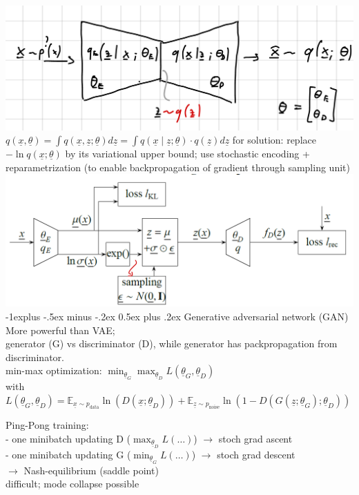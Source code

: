 \documentclass[a4paper,10pt,landscape]{article}
\makeatletter
\renewcommand{\subsection}{\@startsection{subsection}{2}{0mm}%
                                {-1explus -.5ex minus -.2ex}%
                                {0.5ex plus .2ex}%
                                {\normalfont\normalsize\bfseries}}
\newcommand{\x}{\underline{x}}
\newcommand{\utheta}{\underline{\theta}}
\makeatother
\begin{document}
\begin{multicols*}{3}
    \includegraphics[width=0.6\linewidth]{Graphics/vae.png}\\
    $q(\x, \utheta)= \int q(\x, \underline{z}; \utheta ) d\underline{z} = \int q( \x \mid \underline{z}; \utheta) \cdot q(\underline{z}) d \underline{z}$
    for solution: replace $-\ln q(\x; \utheta)$ by its variational upper bound;
    use stochastic encoding + reparametrization (to enable backpropagation of gradient through sampling unit)\\
    \includegraphics[width=0.8\linewidth]{Graphics/vae-stochasticEncoding-reparametrization.png}\\

    \subsection{Generative adversarial network (GAN)}
    More powerful than VAE;\\
    generator (G) vs discriminator (D), while generator has packpropagation from discriminator.\\
    min-max optimization: $\min_{\utheta_G}\max_{\utheta_D} L(\utheta_G, \utheta_D)$\\
    with $L(\utheta_G, \utheta_D) = \mathbb{E}_{\x\sim p_{\textrm{data}}} \ln(D(\x; \utheta_D)) + \mathbb{E}_{\underline{z}\sim p_{\textrm{noise}}} \ln\left(1 - D(G(\underline{z};\utheta_G); \utheta_D)\right)$

    Ping-Pong training:\\
    - one minibatch updating D ($\max_{\utheta_D} L(\ldots)$) 
        $\rightarrow$ stoch grad ascent \\
    - one minibatch updating G ($\min_{\utheta_G} L(\ldots)$) 
        $\rightarrow$ stoch grad descent\\
     $\rightarrow$ Nash-equilibrium (saddle point)\\
     difficult; mode collapse possible


\end{multicols*}
\end{document}
